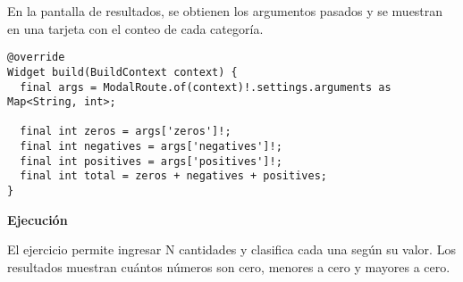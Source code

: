 En la pantalla de resultados, se obtienen los argumentos pasados y se muestran en una tarjeta con el conteo de cada categoría.

\begin{center}
\begin{lstlisting}
@override
Widget build(BuildContext context) {
  final args = ModalRoute.of(context)!.settings.arguments as Map<String, int>;

  final int zeros = args['zeros']!;
  final int negatives = args['negatives']!;
  final int positives = args['positives']!;
  final int total = zeros + negatives + positives;
}
\end{lstlisting}
\end{center}

\textbf{Ejecución}

El ejercicio permite ingresar N cantidades y clasifica cada una según su valor. Los resultados muestran cuántos números son cero, menores a cero y mayores a cero.

